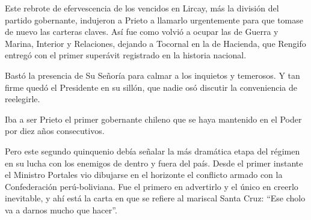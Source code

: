 \documentclass[10pt,twoside,openright]{memoir}
\begin{document}
Este rebrote de efervescencia de los vencidos en Lircay, más la división
del partido gobernante, indujeron a Prieto a llamarlo urgentemente para
que tomase de nuevo las carteras claves. Así fue como volvió a ocupar
las de Guerra y Marina, Interior y Relaciones, dejando a Tocornal en la
de Hacienda, que Rengifo entregó con el primer superávit registrado en
la historia nacional.

Bastó la presencia de Su Señoría para calmar a los inquietos y
temerosos. Y tan firme quedó el Presidente en su sillón, que nadie osó
discutir la conveniencia de reelegirle.

Iba a ser Prieto el primer gobernante chileno que se haya mantenido en
el Poder por diez años consecutivos.

Pero este segundo quinquenio debía señalar la más dramática etapa del
régimen en su lucha con los enemigos de dentro y fuera del país. Desde
el primer instante el Ministro Portales vio dibujarse en el horizonte el
conflicto armado con la Confederación perú-boliviana. Fue el primero en
advertirlo y el único en creerlo inevitable, y ahí está la carta en que
se refiere al mariscal Santa Cruz: ``Ese cholo va a darnos mucho que
hacer''.
\end{document}
